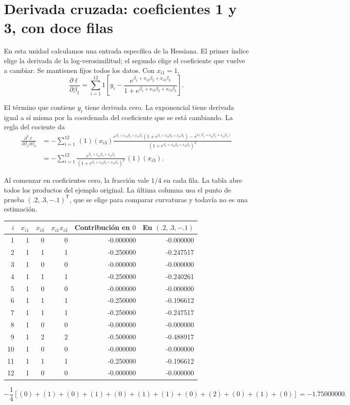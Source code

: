 \documentclass[11pt,a4paper]{article}
\begin{document}
\clearpage
\section{Derivada cruzada: coeficientes 1 y 3, con doce filas}\label{logit21}
En esta unidad calculamos una entrada específica de la Hessiana.
El primer índice elige la derivada de la log-verosimilitud; el segundo
elige el coeficiente que vuelve a cambiar.
Se mantienen fijos todos los datos. Con $x_{i1}=1$,
\[
\frac{\partial\ell}{\partial\beta_1}=\sum_{i=1}^{12}1\left[y_i-\frac{e^{\beta_1+x_{i2}\beta_2+x_{i3}\beta_3}}{1+e^{\beta_1+x_{i2}\beta_2+x_{i3}\beta_3}}\right].
\]

El término que contiene $y_i$ tiene derivada cero.
La exponencial tiene derivada igual a sí misma por la coordenada
del coeficiente que se está cambiando. La regla del cociente da
\[
\begin{aligned}
\frac{\partial^2\ell}{\partial\beta_1\partial\beta_3}&=-\sum_{i=1}^{12}\,(1)(x_{i3})\frac{e^{\beta_1+x_{i2}\beta_2+x_{i3}\beta_3}(1+e^{\beta_1+x_{i2}\beta_2+x_{i3}\beta_3})-e^{2(\beta_1+x_{i2}\beta_2+x_{i3}\beta_3)}}{(1+e^{\beta_1+x_{i2}\beta_2+x_{i3}\beta_3})^2}\\&=-\sum_{i=1}^{12}\frac{e^{\beta_1+x_{i2}\beta_2+x_{i3}\beta_3}}{(1+e^{\beta_1+x_{i2}\beta_2+x_{i3}\beta_3})^2}\,(1)(x_{i3}).\end{aligned}
\]

Al comenzar en coeficientes cero, la fracción vale $1/4$ en cada fila.
La tabla abre todos los productos del ejemplo original. La última
columna usa el punto de prueba $(.2,.3,-.1)^\mathsf T$, que se elige
para comparar curvaturas y todavía no es una estimación.
\begin{center}\small
\begin{tabular}{rrrrrr}
\toprule
$i$&$x_{i1}$&$x_{i3}$&$x_{i1}x_{i3}$&Contribución en $0$&En $(.2,.3,-.1)$\\\midrule1&1&0&0&-0.000000&-0.000000\\
2&1&1&1&-0.250000&-0.247517\\
3&1&0&0&-0.000000&-0.000000\\
4&1&1&1&-0.250000&-0.240261\\
5&1&0&0&-0.000000&-0.000000\\
6&1&1&1&-0.250000&-0.196612\\
7&1&1&1&-0.250000&-0.247517\\
8&1&0&0&-0.000000&-0.000000\\
9&1&2&2&-0.500000&-0.488917\\
10&1&0&0&-0.000000&-0.000000\\
11&1&1&1&-0.250000&-0.196612\\
12&1&0&0&-0.000000&-0.000000\\\bottomrule\end{tabular}\end{center}\[
-\frac14\left[(0)+(1)+(0)+(1)+(0)+(1)+(1)+(0)+(2)+(0)+(1)+(0)\right]=-1.75000000.
\]
\end{document}
